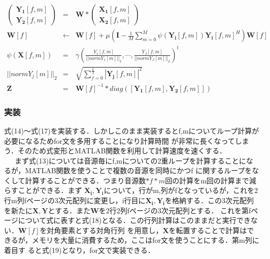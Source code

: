 \documentclass[a4j]{jarticle}
\begin{document}
\begin{eqnarray}
\left(
 \begin{array}{cc}
  \bm{Y_1}[f,m]\\
  \bm{Y_2}[f,m]
 \end{array}
\right)
&=&
\bm{W} * 
\left(
 \begin{array}{cc}
  \bm{X_1}[f,m]\\
  \bm{X_2}[f,m]
 \end{array}
\right) \\
\bm{W}[f] &\leftarrow & \bm{W}[f] + \mu \left(\bm{I} - \frac{1}{M}\sum_{m=0}^{M}\psi (\bm{Y_i}[f,m])\bm{Y_i}[f,m]^H
					\right)\bm{W}[f] \\
\psi(\bm{X}[f,m]) &=& \gamma \left(\frac{Y_1[f,m]}{||normY_1[m]||_2}, \cdots ,
			      \frac{Y_J[f,m]}{||normY_J[m]||_2}\right)^t \\
||normY_j[m]||_2 &=& \sqrt{\sum_{f=0}^{\frac{L}{2}} |\bm{Y_j}[f,m]|^2} \\
\bm{Z} &=& \bm{W}[f]^{-1} * diag([\bm{Y_1}[f,m], \bm{Y_2}[f,m]])
\end{eqnarray}

\subsubsection*{実装}
式(14)〜式(17)を実装する．しかしこのまま実装するとf,mについてループ計算が必要になるためfor文を多用することになり計算時間
が非常に長くなってしまう．そのため式変形とMATLAB関数を利用して計算速度を速くする．\\\ \ \ 
まず式(13)については音源毎にf,mについての2重ループを計算することになるが，MATLAB関数を使うことで複数の音源を同時にかつf
に関するループをなくして計算することができる．つまり音源数$* f * m$回の計算をm回の計算まで減らすことができる．まず
$\bm{X_i}, \bm{Y_i}$について，行がm,列がfとなっているが，これを2行m列fページの3次元配列に変更し，i行目に$\bm{X_i},
\bm{Y_i}$を格納する．この3次元配列を新たに$\bm{X}, \bm{Y}$とする．また$\bm{W}$を2行2列fページの3次元配列とする．
これを第fページについて式に表すと式(18)となる．この行列計算はこのままだと実行できない．$\bm{W}[f]$を対角要素とする対角行列
を用意し，$\bm{X}$を転置することで計算はできるが，メモリを大量に消費するため，ここはfor文を使うことにする．第m列に着目す
ると式(19)となり，for文で実装できる．
\end{document}
